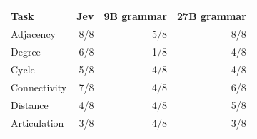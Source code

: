 \begin{tabular}{lrrr}
\toprule
Task & Jev & 9B grammar & 27B grammar \\
\midrule
Adjacency & 8/8 & 5/8 & 8/8 \\
Degree & 6/8 & 1/8 & 4/8 \\
Cycle & 5/8 & 4/8 & 4/8 \\
Connectivity & 7/8 & 4/8 & 6/8 \\
Distance & 4/8 & 4/8 & 5/8 \\
Articulation & 3/8 & 4/8 & 3/8 \\
\bottomrule
\end{tabular}
